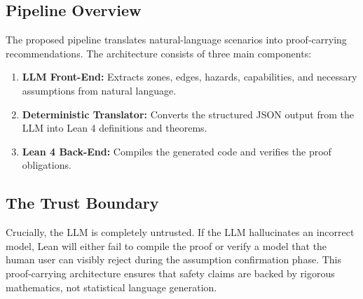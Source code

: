 \subsection{Pipeline Overview}
The proposed pipeline translates natural-language scenarios into proof-carrying recommendations. The architecture consists of three main components:
\begin{enumerate}
    \item \textbf{LLM Front-End:} Extracts zones, edges, hazards, capabilities, and necessary assumptions from natural language.
    \item \textbf{Deterministic Translator:} Converts the structured JSON output from the LLM into Lean 4 definitions and theorems.
    \item \textbf{Lean 4 Back-End:} Compiles the generated code and verifies the proof obligations.
\end{enumerate}

\subsection{The Trust Boundary}
Crucially, the LLM is completely untrusted. If the LLM hallucinates an incorrect model, Lean will either fail to compile the proof or verify a model that the human user can visibly reject during the assumption confirmation phase. This proof-carrying architecture \cite{necula1997proof} ensures that safety claims are backed by rigorous mathematics, not statistical language generation.
